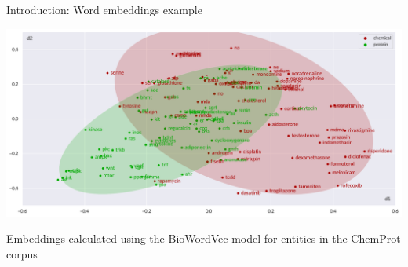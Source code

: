 \begin{frame}[t]{Introduction: Word embeddings example}

\centering

\vspace*{-4mm}

\includegraphics[width=\textwidth]{img/chemprot-word-embeddings/v2/128-ellipses.pdf}%

\vspace*{1mm}

\fontsize{5pt}{6pt}\selectfont
Embeddings calculated using the BioWordVec model for entities in the ChemProt corpus

\end{frame}

